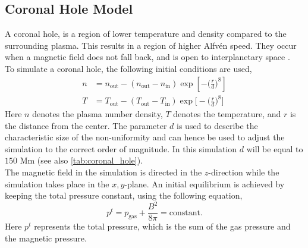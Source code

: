 \documentclass[a4paper]{article}
\begin{document}
\subsection{Coronal Hole Model}
A coronal hole, is a region of lower temperature and density compared to the surrounding plasma. This results in a region of higher Alfv\'en speed. They occur when a magnetic field does not fall back, and is open to interplanetary space .\\

To simulate a coronal hole, the following initial conditions are used,
\begin{align*}
    n &= n_{\text{out}} - (n_{\text{out}}-n_{\text{in}})\exp\left[-\bigg(\frac{r}{d}\bigg)^8\right]\\
    T &= T_{\text{out}} - (T_{\text{out}}-T_{\text{in}})\exp\bigg[-\bigg(\frac{r}{d}\bigg)^8\bigg]
\end{align*}
Here $n$ denotes the plasma number density, $T$ denotes the temperature, and $r$ is the distance from the center. The parameter $d$ is used to describe the characteristic size of the non-uniformity and can hence be used to adjust the simulation to the correct order of magnitude. In this simulation $d$ will be equal to $150$ Mm (see also \cref{tab:coronal_hole}).\\

The magnetic field in the simulation is directed in the $z$-direction while the simulation takes place in the $x,y$-plane. An initial equilibrium is achieved by keeping the total pressure constant, using the following equation,
\begin{equation*}
    p^t = p_{\text{gas}} + \frac{B^2}{8\pi} = \text{constant}.
\end{equation*}
Here $p^t$ represents the total pressure, which is the sum of the gas pressure and the magnetic pressure. \\
\end{document}

